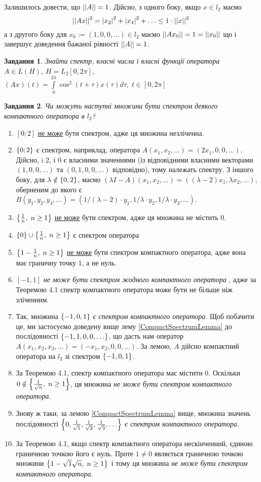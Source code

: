 \documentclass[10pt]{article}
\newtheorem{prob}{Завдання}
\let\oldint\int
\renewcommand{\int}{\oldint\limits}
\begin{document}
	Залишилось довести, що $\left|\left|A\right|\right|=1$. Дійсно, з одного боку, якщо $x\in l_2$ маємо
	\[\left|\left|Ax\right|\right|^2=\left|x_2\right|^2+\left|x_4\right|^2+\hdots\leq1\cdot\left|\left|x\right|\right|^2\]
	а з другого боку для $x_0:=(1,0,0,\hdots)\in l_2$ маємо
	$\left|\left|Ax_0\right|\right|=1=\left|\left|x_0\right|\right|$
	що і завершує доведення бажаної рівності $\left|\left|A\right|\right|=1$.
\begin{prob}Знайти спектр, власні числа і власні функції оператора $A\in L(H)$, $H=L_2[0,2\pi]$, $(Ax)(t)=\int_0^{2\pi}\cos^2(t+\tau)x(\tau)
	d\tau,\;t\in[0,2\pi]$
\end{prob}
\begin{prob}Чи можуть наступні множини бути спектром деякого компактного оператора в $l_2$?\end{prob}
\begin{enumerate}
	\renewcommand{\labelenumi}{\myralph{enumi})}
\item $[0;2]$ \uline{не може} бути спектром, адже ця множина незліченна.
\item $\left\{0;2\right\}$ є спектром, наприклад, оператора $A(x_1,x_2,\hdots)=(2x_1,0,0,\hdots)$. Дійсно, i 2, і 0 є власними значеннями (із відповідними
	власними векторами $(1,0,0,\hdots)$ та $(0,1,0,0,\hdots)$ відповідно), тому належать спектру. З іншого боку, для $\lambda\notin\left\{0,2\right\}$,
	маємо $(\lambda I-A)(x_1,x_2,\hdots)=((\lambda-2)x_1,\lambda x_2,\hdots)$, оберненим до якого є 
	$B(y_1,y_2,y_3,\hdots)=(1/(\lambda-2)\cdot y_1,1/\lambda\cdot y_2,1/\lambda\cdot y_3,\hdots)$.
\item $\left\{\frac{1}{n},\;n\geq1\right\}$ \uline{не може} бути спектром, адже ця множина не містить 0.
\item $\left\{0\right\}\cup\left\{\frac{1}{n},\;n\geq1\right\}$ є спектром оператора %
\item $\left\{1-\frac{1}{n},\;n\geq1\right\}$ \uline{не може} бути спектром компактного оператора, адже вона має граничну точку $1$, а не нуль.
\item{$[-1,1]$ {\it не може бути спектром жодного компактного оператора}
	, адже за Теоремою 4.1 спектр компактного оператора може бути не більше ніж зліченним.}
	\item{Так, множина $\left\{-1,0,1\right\}$ {\it є спектром компактного оператора}. Щоб побачити це, ми застосуємо доведену вище лему
		\ref{CompactSpectrumLemma} до
		послідовності $\left\{-1,1,0,0,\hdots\right\}$, що дасть нам оператор $A(x_1,x_2,x_3,\hdots)=(-x_1,x_2,0,0,\hdots)$. За лемою, $A$
		дійсно компактний оператора на $l_2$ зі спектром $\left\{-1,0,1\right\}$.}
	\item{За Теоремою 4.1, спектр компактного оператора має містити 0. Оскільки $0\notin\left\{\frac{1}{\sqrt{n}},\;n\geq 1\right\}$, ця множина
		{\it не може бути спектром компактного оператора.}}
	\item{Знову ж таки, за лемою \ref{CompactSpectrumLemma} вище, множина значень послідовності
		$\left\{0,\frac{1}{\sqrt{1}},\frac{1}{\sqrt{2}},\frac{1}{\sqrt{3}},\hdots\right\}$ {\it є спектром компактного оператора.}}
	\item{За Теоремою 4.1, якщо спектр компактного оператора нескінченний, єдиною граничною точкою його є нуль. Проте $1\neq 0$ являється
		граничною точкою множини $\left\{1-\sqrt{1}{\sqrt{n}},\;n\geq 1\right\}$ і тому ця множина {\it 
		не може бути спектром компактного оператора.}}
\end{enumerate}
\end{document}

